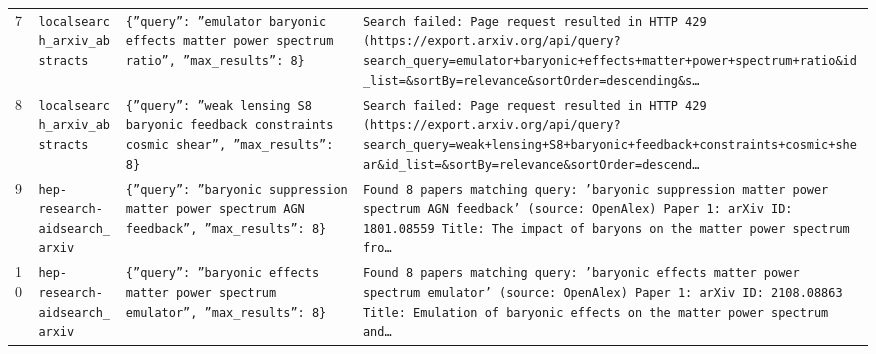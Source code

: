 \documentclass[11pt,a4paper]{article}
\begin{document}
\begin{longtable}{@{}p{}p{}p{}p{}@{}}
7 & \texttt{local}\newline\texttt{search\_\allowbreak{}arxiv\_\allowbreak{}abstracts} & \texttt{\{''query'':\allowbreak{} ''emulator baryonic effects matter power spectrum ratio'',\allowbreak{} ''max\_\allowbreak{}results'':\allowbreak{} 8\}\allowbreak{}} & \texttt{Search failed:\allowbreak{} Page request resulted in HTTP 429 (https:\allowbreak{}/\allowbreak{}/\allowbreak{}export.arxiv.org/\allowbreak{}api/\allowbreak{}query?search\_\allowbreak{}query=\allowbreak{}emulator+baryonic+effects+matter+power+spectrum+ratio\&id\_\allowbreak{}list=\allowbreak{}\&sortBy=\allowbreak{}relevance\&sortOrder=\allowbreak{}descending\&s\ldots{}\allowbreak{}} \\
8 & \texttt{local}\newline\texttt{search\_\allowbreak{}arxiv\_\allowbreak{}abstracts} & \texttt{\{''query'':\allowbreak{} ''weak lensing S8 baryonic feedback constraints cosmic shear'',\allowbreak{} ''max\_\allowbreak{}results'':\allowbreak{} 8\}\allowbreak{}} & \texttt{Search failed:\allowbreak{} Page request resulted in HTTP 429 (https:\allowbreak{}/\allowbreak{}/\allowbreak{}export.arxiv.org/\allowbreak{}api/\allowbreak{}query?search\_\allowbreak{}query=\allowbreak{}weak+lensing+S8+baryonic+feedback+constraints+cosmic+shear\&id\_\allowbreak{}list=\allowbreak{}\&sortBy=\allowbreak{}relevance\&sortOrder=\allowbreak{}descend\ldots{}\allowbreak{}} \\
9 & \texttt{hep-research-aid}\newline\texttt{search\_\allowbreak{}arxiv} & \texttt{\{''query'':\allowbreak{} ''baryonic suppression matter power spectrum AGN feedback'',\allowbreak{} ''max\_\allowbreak{}results'':\allowbreak{} 8\}\allowbreak{}} & \texttt{Found 8 papers matching query:\allowbreak{} 'baryonic suppression matter power spectrum AGN feedback' (source:\allowbreak{} OpenAlex)\allowbreak{}  Paper 1:\allowbreak{} arXiv ID:\allowbreak{} 1801.08559 Title:\allowbreak{} The impact of baryons on the matter power spectrum fro\ldots{}\allowbreak{}} \\
10 & \texttt{hep-research-aid}\newline\texttt{search\_\allowbreak{}arxiv} & \texttt{\{''query'':\allowbreak{} ''baryonic effects matter power spectrum emulator'',\allowbreak{} ''max\_\allowbreak{}results'':\allowbreak{} 8\}\allowbreak{}} & \texttt{Found 8 papers matching query:\allowbreak{} 'baryonic effects matter power spectrum emulator' (source:\allowbreak{} OpenAlex)\allowbreak{}  Paper 1:\allowbreak{} arXiv ID:\allowbreak{} 2108.08863 Title:\allowbreak{} Emulation of baryonic effects on the matter power spectrum and\ldots{}\allowbreak{}} \\

\end{longtable}
\end{document}
